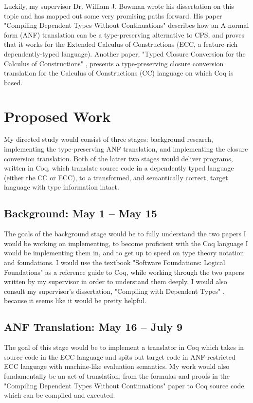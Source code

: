 \documentclass[manuscript]{acmart}
\begin{document}
Luckily, my supervisor Dr. William J. Bowman wrote his dissertation on this topic and has mapped out some very promising paths forward. His paper "Compiling Dependent Types Without Continuations" \cite{bowman_ahmed_2019} describes how an A-normal form (ANF) translation can be a type-preserving alternative to CPS, and proves that it works for the Extended Calculus of Constructions (ECC, a feature-rich dependently-typed language). Another paper, "Typed Closure Conversion for the Calculus of Constructions" \cite{bowman_ahmed_2018}, presents a type-preserving closure conversion translation for the Calculus of Constructions (CC) language on which Coq is based.

\section{Proposed Work}

My directed study would consist of three stages: background research, implementing the type-preserving ANF translation, and implementing the closure conversion translation. Both of the latter two stages would deliver programs, written in Coq, which translate source code in a dependently typed language (either the CC or ECC), to a transformed, and semantically correct, target language with type information intact.

\subsection{Background: May 1 -- May 15}
The goals of the background stage would be to fully understand the two papers I would be working on implementing, to become proficient with the Coq language I would be implementing them in, and to get up to speed on type theory notation and foundations. I would use the textbook "Software Foundations: Logical Foundations" as a reference guide to Coq, while working through the two papers written by my supervisor in order to understand them deeply. I would also consult my supervisor's dissertation, "Compiling with Dependent Types" \cite{bowman_2019}, because it seems like it would be pretty helpful.

\subsection{ANF Translation: May 16 -- July 9}
The goal of this stage would be to implement a translator in Coq which takes in source code in the ECC language and spits out target code in ANF-restricted ECC language with machine-like evaluation semantics. My work would also fundamentally be an act of translation, from the formulas and proofs in the "Compiling Dependent Types Without Continuations" paper to Coq source code which can be compiled and executed.
\end{document}
